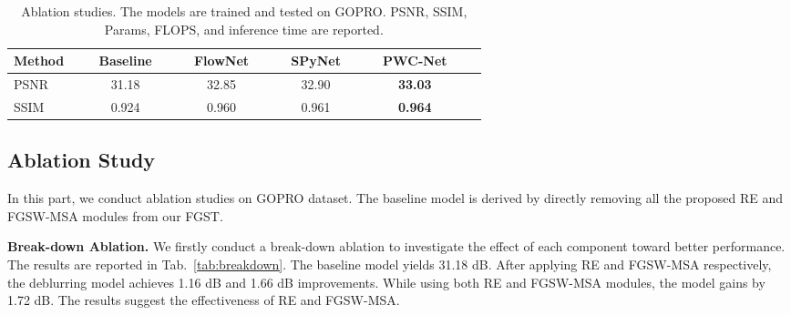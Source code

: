 \documentclass{article}
\begin{document}
\begin{table*}[t]
{{\begin{tabular}{l c c c c c}
					\toprule
					\rowcolor{color3}Method~&~~Baseline~~ &~~FlowNet~~  &~~SPyNet~~  &~~PWC-Net~~  \\
\midrule
					PSNR~  &31.18 &32.85 &32.90 &\bf 33.03\\
					SSIM~~  &0.924 &0.960 &0.961 &\bf 0.964\\
					\bottomrule
		\end{tabular}}}\vspace{-3mm}
\caption{\small Ablation studies. The models are trained and tested on GOPRO. PSNR, SSIM, Params, FLOPS, and inference time  are reported.}
		\label{tab:ablations}\vspace{-5mm}
	\end{table*}
	
	\vspace{-10mm}
	\subsection{Ablation Study}
	\vspace{-1mm}
	In this part, we conduct ablation studies on GOPRO dataset. The baseline model is derived by directly removing all the proposed RE and FGSW-MSA modules from our FGST. 
	
	\noindent\textbf{Break-down Ablation.} We firstly conduct a break-down ablation to investigate the effect of each component toward better performance. The results are reported in Tab.~\ref{tab:breakdown}. The baseline model yields 31.18 dB. After applying RE and FGSW-MSA respectively, the deblurring model achieves 1.16 dB and 1.66 dB improvements. While using both RE and FGSW-MSA modules, the model gains by 1.72 dB. The results suggest the effectiveness of RE and FGSW-MSA.
	
\end{document}
